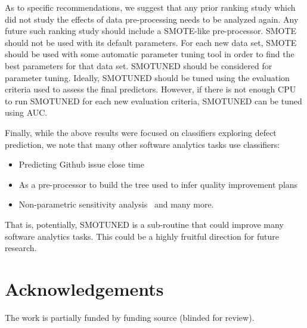\documentclass[sigconf,review, anonymous]{acmart}
\newcommand{\bi}{\begin{itemize}[leftmargin=0.4cm]}
\newcommand{\ei}{\end{itemize}}
\theoremstyle{break}
\theoremstyle{break}
\newcommand{\sma}{{\sc SMOTE}}
\newcommand{\smb}{{\sc SMOTUNED}}
\begin{document}
As to specific recommendations, we suggest that any prior ranking study  which did not  study the effects of data pre-processing needs to be analyzed again. Any future such ranking study should include a {\sma}-like
 pre-processor. {\sma} should not be used with its default parameters.
 For each new data set, {\sma} should be used with some automatic parameter tuning tool in
order to find the best parameters for that data set. {\smb} should be considered for parameter tuning. Ideally, {\smb} should be tuned using the evaluation criteria used to assess the final predictors. However, if there is not enough CPU to run {\smb} for each new evaluation criteria, {\smb} can be tuned using AUC.



Finally, while the above results were focused on classifiers exploring defect prediction, we note that many other software analytics
tasks use classifiers:
\bi
\item Predicting Github issue close time~\cite{jones17}
\item As a pre-processor to build the tree used to 
infer quality improvement plans~\cite{krishna2017less}
\item Non-parametric sensitivity analysis~\cite{menzies2000practical} and many more.
\ei
That is, potentially, {\smb} is  a sub-routine that could improve many software analytics tasks. This could be a highly fruitful direction for future research.

\section*{Acknowledgements}
The work is partially funded by
funding source (blinded for review).

\balance

%


 
\end{document}
